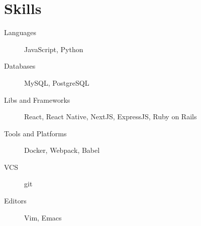 \documentclass[letterpaper]{article}
\begin{document}
\section{Skills}
\label{sec:orgad4955f}
\begin{description}
\item[{Languages}] JavaScript, Python
\item[{Databases}] MySQL, PostgreSQL
\item[{Libs and Frameworks}] React, React Native, NextJS, ExpressJS, Ruby on Rails
\item[{Tools and Platforms}] Docker, Webpack, Babel
\item[{VCS}] git
\item[{Editors}] Vim, Emacs
\end{description}
\end{document}
